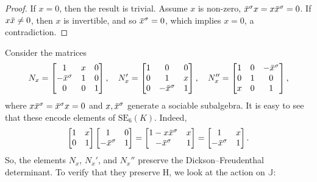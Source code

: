 \documentclass{amsart}
\def\ovx{\mathord{\mbox{\hspace*{0pt}}\,\overline{\!x\!\!\;}\!\:}\mbox{\hspace*{0pt}}}
\newcommand{\SE}{\mathrm{SE}}
\newcommand{\J}{\mathbb{J}}
\renewcommand{\H}{\mathrm{H}}
\newcommand{\s}{\sigma}
\theoremstyle{plain}
\numberwithin{theorem}{section}
\theoremstyle{definition}
\begin{document}
\begin{proof}
	If $x = 0$, then the result is trivial. Assume $x$ is non-zero, $\ovx^{\s} x = x\ovx^{\s} = 0$.
	If $x \ovx \neq 0$, then $x$ is invertible, and so $\ovx^{\s} = 0$, which implies $x = 0$, a 
	contradiction.
\end{proof}

Consider the matrices
\begin{equation}
	N_x = \begin{bmatrix}
		1 & x & 0 \\
		-\ovx^{\s} & 1 & 0 \\
		0 & 0 & 1
	\end{bmatrix},\quad
	N_x' = \begin{bmatrix}
		1 & 0 & 0 \\
		0 & 1 & x \\
		0 & -\ovx^{\s} & 1
	\end{bmatrix},\quad
	N_x'' = \begin{bmatrix}
		1 & 0 & -\ovx^{\s} \\
		0 & 1 & 0 \\
		x & 0 & 1
	\end{bmatrix},
\end{equation}
where $x\ovx^{\s} = \ovx^{\s}x = 0$ and $x,\ovx^{\s}$ generate a sociable subalgebra. 
It is easy to see that these encode elements of $\SE_6(K)$. Indeed,
\begin{equation}
	\begin{bmatrix}
		1 & x \\
		0 & 1
	\end{bmatrix}
	\begin{bmatrix}
		1 & 0 \\
		-\ovx ^{\s} & 1
	\end{bmatrix} = 
	\begin{bmatrix}
		1 - x\ovx ^{\s} & x \\
		-\ovx ^{\s} & 1 
	\end{bmatrix} = 
	\begin{bmatrix}
		1 & x \\
		-\ovx ^{\s} & 1
	\end{bmatrix}.
\end{equation}
So, the elements $N_x$, $N_x'$, and $N_x''$ preserve the Dickson--Freudenthal determinant. 
To verify that they preserve $\H$, we look at the action on $\J$:
\end{document}

